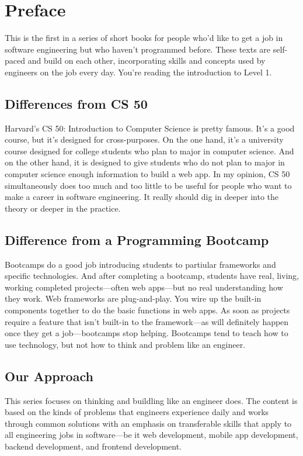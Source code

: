 \chapter{Preface}

This is the first in a series of short books for people who'd like to get a job
in software engineering but who haven't programmed before. These texts are
self-paced and build on each other, incorporating skills and concepts used by
engineers on the job every day. You're reading the introduction to Level 1.

\section*{Differences from CS 50}
Harvard's CS 50: Introduction to Computer Science is pretty famous. It's a good
course, but it's designed for cross-purposes. On the one hand, it's a university
course designed for college students who plan to major in computer science. And
on the other hand, it is designed to give students who do not plan to major in
computer science enough information to build a web app. In my opinion, CS 50
simultaneously does too much and too little to be useful for people who want to
make a career in software engineering. It really should dig in deeper into the
theory or deeper in the practice.

\section*{Difference from a Programming Bootcamp}
Bootcamps do a good job introducing students to partiular frameworks and
specific technologies. And after completing a bootcamp, students have real,
living, working completed projects---often web apps---but no real understanding
how they work. Web frameworks are plug-and-play. You wire up the built-in
components together to do the basic functions in web apps. As soon as projects
require a feature that isn't built-in to the framework---as will definitely
happen once they get a job---bootcamps stop helping. Bootcamps tend to teach how
to use technology, but not how to think and problem like an engineer.

\section*{Our Approach}
This series focuses on thinking and buildling like an engineer does. The content
is based on the kinds of problems that engineers experience daily and works
through common solutions with an emphasis on transferable skills that apply to
all engineering jobs in software---be it web development, mobile app
development, backend development, and frontend development.

